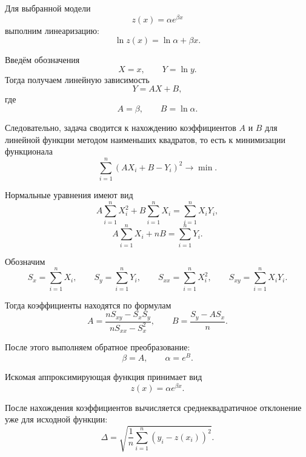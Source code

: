 Для выбранной модели
\[
z(x)=\alpha e^{\beta x}
\]
выполним линеаризацию:
\[
\ln z(x)=\ln \alpha+\beta x.
\]

Введём обозначения
\[
X=x,\qquad Y=\ln y.
\]
Тогда получаем линейную зависимость
\[
Y=AX+B,
\]
где
\[
A=\beta,\qquad B=\ln \alpha.
\]

Следовательно, задача сводится к нахождению коэффициентов $A$ и $B$
для линейной функции методом наименьших квадратов, то есть к минимизации
функционала
\[
\sum_{i=1}^{n}\left(AX_i+B-Y_i\right)^2 \to \min.
\]

Нормальные уравнения имеют вид
\[
A\sum_{i=1}^{n}X_i^2+B\sum_{i=1}^{n}X_i=\sum_{i=1}^{n}X_iY_i,
\]
\[
A\sum_{i=1}^{n}X_i+nB=\sum_{i=1}^{n}Y_i.
\]

Обозначим
\[
S_x=\sum_{i=1}^{n}X_i,\qquad
S_y=\sum_{i=1}^{n}Y_i,\qquad
S_{xx}=\sum_{i=1}^{n}X_i^2,\qquad
S_{xy}=\sum_{i=1}^{n}X_iY_i.
\]

Тогда коэффициенты находятся по формулам
\[
A=\frac{nS_{xy}-S_xS_y}{nS_{xx}-S_x^2},
\qquad
B=\frac{S_y-AS_x}{n}.
\]

После этого выполняем обратное преобразование:
\[
\beta=A,\qquad \alpha=e^B.
\]

Искомая аппроксимирующая функция принимает вид
\[
z(x)=\alpha e^{\beta x}.
\]

После нахождения коэффициентов вычисляется среднеквадратичное отклонение
уже для исходной функции:
\[
\Delta=\sqrt{\frac{1}{n}\sum_{i=1}^{n}\left(y_i-z(x_i)\right)^2 }.
\]